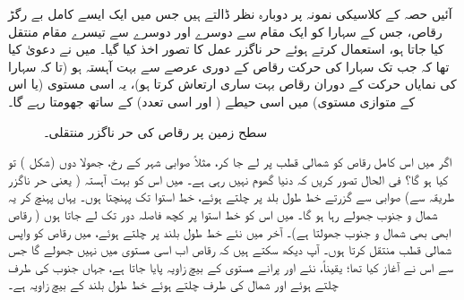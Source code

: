 آئیں   حصہ   کے    کلاسیکی نمونہ   پر دوبارہ نظر ڈالتے ہیں جس میں ایک ایسے     کامل  بے  رگڑ    رقاص،   جس کے  سہارا  کو ایک مقام سے دوسرے  اور دوسرے سے تیسرے  مقام منتقل کیا جاتا ہو،   استعمال کرتے ہوئے حر ناگزر عمل کا تصور اخذ کیا گیا۔ میں نے دعویٰ کیا تھا کہ جب تک سہارا  کی حرکت   رقاص  کے دوری عرصے سے بہت  آہستہ ہو  (تا کہ   سہارا کی نمایاں حرکت کے دوران    رقاص    بہت ساری ارتعاش کرتا ہو)،   یہ اسی مستوی  (یا اس کے متوازی مستوی)  میں اسی  حیطے  ( اور اسی تعدد)  کے ساتھ جھومتا رہے گا۔
\begin{figure}
\centering
{}
\caption{سطح زمین پر رقاص کی حر ناگزر منتقلی۔}
\label{شکل_حرارت_نا_گزر_سطح_زمین_منتقل}
\end{figure}



  اگر میں اس کامل  رقاص  کو شمالی قطب پر لے جا کر،   مثلاً  صوابی شہر کے رخ،    جھولا دوں  (شکل ) تو کیا ہو گا؟  فی الحال تصور کریں کہ دنیا گھوم نہیں رہی ہے۔  میں اس کو بہت آہستہ ( یعنی حر ناگزر طریقہ سے)  صوابی سے گزرتے  خط طول بلد پر چلتے ہوئے،   خط استوا تک پہنچتا ہوں۔ یہاں پہنچ کر یہ شمال و جنوب جھولے  رہا ہو گا۔ میں اس کو  خط استوا پر کچھ فاصلہ دور تک لے جاتا ہوں (  رقاص  ابھی بھی شمال و جنوب جھولتا ہے)۔  آخر میں  نئے  خط طول بلند پر چلتے ہوئے، میں رقاص کو   واپس شمالی قطب منتقل کرتا ہوں۔  آپ دیکھ سکتے ہیں کہ   رقاص  اب  اسی مستوی میں  نہیں جھولے گا جس سے اس نے آغاز کیا تھا؛   یقیناً،  نئے  اور پرانے   مستوی کے بیچ زاویہ  پایا جاتا ہے،  جہاں جنوب کی طرف چلتے ہوئے اور شمال کی طرف چلتے ہوئے  خط طول بلند کے بیچ زاویہ  ہے۔ 
  
